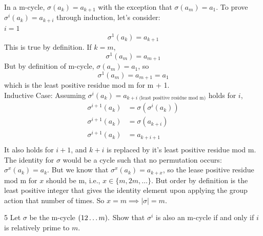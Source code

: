 \documentclass[12pt]{article}
\begin{document}
\begin{solution}
    \bbni 
    \bbni 
    In a m-cycle, $\sigma(a_k) = a_{k+1}$ with the exception that $\sigma(a_m) = a_1$. To prove $\sigma^i(a_k) = a_{k+i}$ through induction, let's consider: \\  
    $i = 1$\\
    \[\sigma^1(a_k) = a_{k+1}\]
    This is true by definition. If $k = m$, 
    \[\sigma^1(a_m) = a_{m+1}\] 
    But by definition of m-cycle, $\sigma(a_m) = a_1$, so 
    \[\sigma^1(a_m) = a_{m+1} = a_1\]
    which is the least positive residue mod m for m + 1. \\
    Inductive Case: Assuming $\sigma^i (a_k) = a_{k+i \text{ (least positive residue mod m)}}$ holds for $i$, 
    \begin{align*}
        \sigma^{i+1} (a_k) &= \sigma(\sigma^i(a_k)) \\
        \sigma^{i+1} (a_k) &= \sigma(a_{k+i}) \\
        \sigma^{i+1} (a_k) &= a_{k+i+1}\\    
    \end{align*}
    It also holds for $i+1$, and $k+i$ is replaced by it's least positive residue mod m. \\ 
    The identity for $\sigma$ would be a cycle such that no permutation occurs: $\sigma^x(a_k) = a_k$. But we know that $\sigma^x(a_k) = a_{k+x}$, so the lease positive residue mod m for $x$ should be m, i.e., $x \in \{m, 2m, \ldots\}$. But order by definition is the least positive integer that gives the identity element upon applying the group action that number of times. So $x = m \implies \mid \sigma \mid = m$. 
\end{solution}

\newpage

\begin{problem}{5}
    Let $\sigma$ be the m-cycle $(1 \space 2 \ldots m).$ Show that $\sigma^i$ is also an m-cycle if and only if $i$ is relatively prime to $m$. 
\end{problem}
\end{document}
